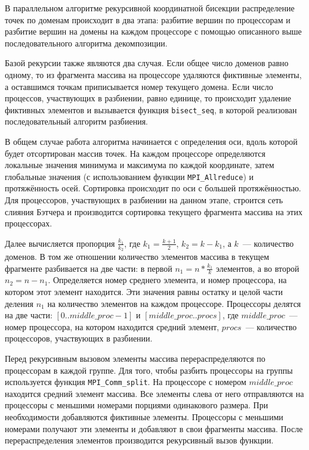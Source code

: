 \documentclass[oneside,final,14pt]{extreport}
\begin{document}
В параллельном алгоритме рекурсивной координатной бисекции распределение точек
по доменам происходит в два этапа: разбитие вершин по процессорам и
разбитие вершин на домены на каждом процессоре с помощью описанного
выше последовательного алгоритма декомпозиции.

Базой рекурсии также являются два случая. Если общее число доменов равно
одному, то из фрагмента массива на процессоре удаляются фиктивные элементы,
а оставшимся точкам приписывается номер текущего домена. Если число
процессов, участвующих в разбиении, равно единице, то происходит удаление
фиктивных элементов и вызывается функция \texttt{bisect\_seq},
в которой реализован последовательный алгоритм разбиения.

В общем случае работа алгоритма начинается с определения оси, вдоль которой
будет отсортирован массив точек. На каждом процессоре определяются локальные
значения минимума и максимума по каждой координате, затем
глобальные значения (с использованием функции \texttt{MPI\_Allreduce}) и
протяжённость осей. Сортировка происходит по оси с большей протяжённостью.
Для процессоров, участвующих в разбиении на данном этапе, строится сеть слияния
Бэтчера и производится сортировка текущего фрагмента массива на этих
процессорах.

Далее вычисляется пропорция $\frac{k_1}{k_2}$, где $k_1 = \frac{k + 1}{2}$,
$k_2 = k - k_1$, а $k$~--- количество доменов. В том же отношении
количество элементов массива в текущем фрагменте разбивается на две части:
в первой $n_1 = n * \frac{k_1}{k}$ элементов, а во второй $n_2 = n - n_1$.
Определяется номер среднего элемента, и номер процессора, на котором
этот элемент находится. Эти значения равны остатку и целой части деления
$n_1$ на количество элементов на каждом процессоре. Процессоры делятся на две
части: $[0 .. middle\_proc - 1]$ и $[middle\_proc .. procs]$, где
$middle\_proc$~--- номер процессора, на котором находится средний элемент,
$procs$~--- количество процессоров, участвующих в разбиении.

Перед рекурсивным вызовом элементы массива перераспределяются по процессорам
в каждой группе. Для того, чтобы разбить процессоры на группы используется
функция \texttt{MPI\_Comm\_split}. На процессоре с номером $middle\_proc$
находится средний элемент массива. Все элементы слева от него отправляются
на процессоры с меньшими номерами порциями одинакового размера. При
необходимости добавляются фиктивные элементы. Процессоры с меньшими номерами
получают эти элементы и добавляют в свои фрагменты массива. После
перераспределения элементов производится рекурсивный вызов функции.
\end{document}
